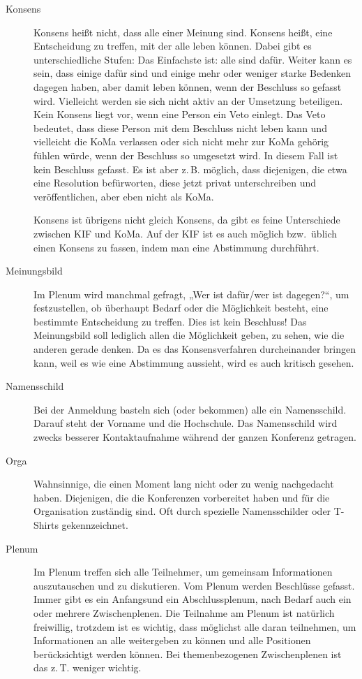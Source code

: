 \begin{description}
\item[Konsens] Konsens heißt nicht, dass alle einer Meinung sind.  Konsens
	heißt, eine Entscheidung zu treffen, mit der alle leben können. Dabei gibt
	es unterschiedliche Stufen: Das Einfachste ist: alle sind dafür. Weiter
	kann es sein, dass einige dafür sind und einige mehr oder weniger starke
	Bedenken dagegen haben, aber damit leben können, wenn der Beschluss so
	gefasst wird. Vielleicht werden sie sich nicht aktiv an der Umsetzung
	beteiligen. Kein Konsens liegt vor, wenn eine Person ein Veto einlegt. Das
	Veto bedeutet, dass diese Person mit dem Beschluss nicht leben kann und
	vielleicht die KoMa verlassen oder sich nicht mehr zur KoMa gehörig fühlen
	würde, wenn der Beschluss so umgesetzt wird. In diesem Fall ist kein
	Beschluss gefasst.  Es ist aber z.\,B. möglich, dass diejenigen, die etwa
	eine Resolution befürworten, diese jetzt privat unterschreiben und
	veröffentlichen, aber eben nicht als KoMa.

	Konsens ist übrigens nicht gleich Konsens, da gibt es feine Unterschiede
	zwischen KIF und KoMa. Auf der KIF ist es auch möglich bzw.\ üblich einen
	Konsens zu fassen, indem man eine Abstimmung durchführt.

\item[Meinungsbild] Im Plenum wird manchmal gefragt, „Wer ist dafür/wer ist
	dagegen?“, um festzustellen, ob überhaupt Bedarf oder die Möglichkeit
	besteht, eine bestimmte Entscheidung zu treffen. Dies ist kein Beschluss!
	Das Meinungsbild soll lediglich allen die Möglichkeit geben, zu sehen, wie
	die anderen gerade denken. Da es das Konsensverfahren durcheinander bringen
	kann, weil es wie eine Abstimmung aussieht, wird es auch kritisch gesehen.

\item[Namensschild] Bei der Anmeldung basteln sich (oder bekommen) alle ein
	Namensschild. Darauf steht der Vorname und die Hochschule. Das Namensschild
	wird zwecks besserer Kontaktaufnahme während der ganzen Konferenz getragen.

\item[Orga] Wahnsinnige, die einen Moment lang nicht oder zu wenig nachgedacht
	haben. Diejenigen, die die Konferenzen vorbereitet haben und für die
	Organisation zuständig sind.  Oft durch spezielle Namensschilder oder
	T-Shirts gekennzeichnet.

\item[Plenum] Im Plenum treffen sich alle Teilnehmer, um gemeinsam
	Informationen auszutauschen und zu diskutieren. Vom Plenum werden
	Beschlüsse gefasst. Immer gibt es ein Anfangsund ein Abschlussplenum, nach
	Bedarf auch ein oder mehrere Zwischenplenen. Die Teilnahme am Plenum ist
	natürlich freiwillig, trotzdem ist es wichtig, dass möglichst alle daran
	teilnehmen, um Informationen an alle weitergeben zu können und alle
	Positionen berücksichtigt werden können. Bei themenbezogenen Zwischenplenen
	ist das z.\,T. weniger wichtig.


\end{description}
